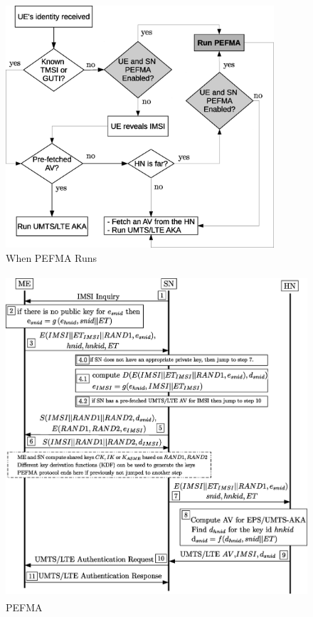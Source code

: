 \documentclass{river-journal}
\begin{document}
\begin{figure}
\begin{center}
  \includegraphics[height=9cm]{when_to_run_PEFMA.eps}
\caption{When PEFMA Runs}
\label{fig:when_pefma_runs}       %
\end{center}
\end{figure}


\begin{figure}
\begin{center}
  \includegraphics[height=12cm]{PEFMA.eps}
\caption{PEFMA}
\label{fig:PEFMA}       %
\end{center}
\end{figure}
\end{document}
